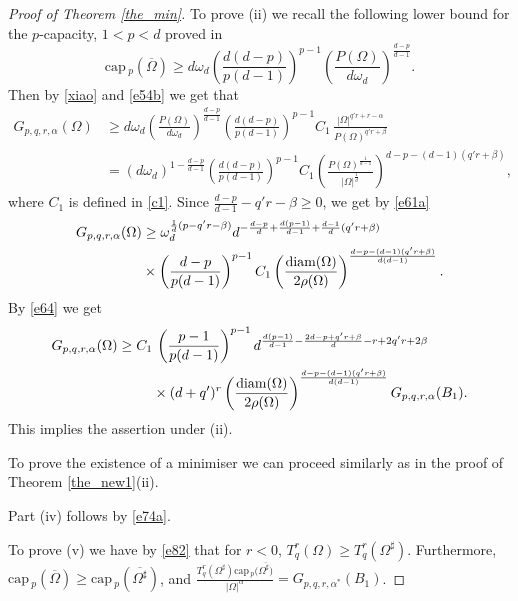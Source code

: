 \documentclass[a4paper,9pt]{article}
\def\cp{\mathrm{cap}\,}
\newcommand{\Om}{\Omega}
\begin{document}
\begin{proof}[Proof of Theorem \ref{the_min}]
To prove (ii) we recall the following lower bound for the $p$-capacity,  $1<p<d$ proved in \cite[(2.5)]{xiao}
\begin{equation}
\label{xiao}
\cp_p(\overline \Omega) \ge d \omega_d\left( \frac{d(d-p)}{p(d-1)}\right)^{p-1}\left(\frac{P(\Omega)}{d\omega_{d}}\right)^{\frac{d-p}{d-1}}.
\end{equation}
Then by \eqref{xiao} and  \eqref{e54b} we get that
\begin{align*}
G_{p,q,r,\alpha}(\Om)&\ge d \omega_d\left(\frac{P(\Omega)}{d\omega_{d}}\right)^{\frac{d-p}{d-1}}\left( \frac{d(d-p)}{p(d-1)}\right)^{p-1} C_1\, \frac{|\Omega|^{q'r+r-\alpha}}{P(\Omega)^{q'r+\beta}}\nonumber\\&
= (d \omega_d)^{1-\frac{d-p}{d-1}}\left( \frac{d(d-p)}{p(d-1)}\right)^{p-1} C_1\left(\frac{P(\Omega)^{\frac{1}{d-1}}}{|\Omega|^{\frac 1 d}}\right)^{d-p-(d-1)(q'r+\beta)},
\end{align*}
where $C_1$ is defined in \eqref{c1}.
Since $\frac{d-p}{d-1}-q'r-\beta\ge 0$, we get by \eqref{e61a}
\begin{align*}
G_{p,q,r,\alpha}(\Om)&\ge \omega_d^{\frac{1}{d}(p-q'r-\beta)} d^{-\frac{d-p}{d}+\frac{d(p-1)}{d-1}+\frac{d-1}{d}(q'r+\beta)}\nonumber\\&\times\left( \frac{d-p}{p(d-1)}\right)^{p-1} C_1\left(\frac{\textup{diam}(\Om)}{2\rho(\Om)}\right)^{\frac{d-p-(d-1)(q'r+\beta)}{d(d-1)}}.
\end{align*}
By \eqref{e64} we get
\begin{align}\label{e74a}
 G_{p,q,r,\alpha}(\Om)\ge  C_1& \,\left( \frac{p-1}{p(d-1)}\right)^{p-1}d^{\frac{d(p-1)}{d-1}-\frac{2d-p+q'r+\beta}{d}-r+2q'r+2\beta} \nonumber\\&\times(d+q')^r \left(\frac{\textup{diam}(\Om)}{2\rho(\Om)}\right)^{\frac{d-p-(d-1)(q'r+\beta)}{d(d-1)}}G_{p,q,r,\alpha}(B_1).
\end{align}
This implies the assertion under (ii).

\smallskip


To prove the existence of a minimiser we can proceed similarly as in  the proof of Theorem \ref{the_new1}(ii).

\smallskip

Part  (iv)  follows by \eqref{e74a}.

\smallskip

To prove (v) we have by \eqref{e82} that for $r<0$, $T^r_q(\Om)\ge T^r_q(\Om^\sharp)$. Furthermore, $\cp_p(\overline{\Om})\ge \cp_p(\overline{\Om^\sharp})$, and $\frac{T^r_q(\Om^\sharp)\cp_p(\overline{\Om^\sharp)}}{|\Om|^{\alpha}}=G_{p,q,r,\alpha^*}(B_1)$.
\end{proof}
\end{document}
